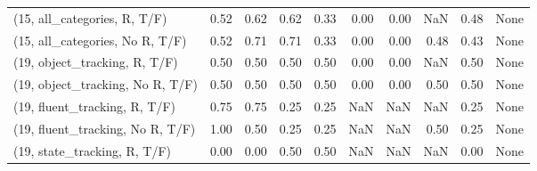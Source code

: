 \begin{table*}[h!]
\begin{adjustbox}{width=2\columnwidth,center}
\begin{tabular}{lrrr|rrr|rrr}
(15, all\_categories, R, T/F)          &                      0.52 &                  0.62 &                      0.62 &                          0.33 &                      0.00 &                          0.00 &                                    NaN &                               0.48 &                                  None \\
(15, all\_categories, No R, T/F)       &                      0.52 &                  0.71 &                      0.71 &                          0.33 &                      0.00 &                          0.00 &                                   0.48 &                               0.43 &                                  None \\



\midrule
(19, object\_tracking, R, T/F)         &                      0.50 &                  0.50 &                      0.50 &                          0.50 &                      0.00 &                          0.00 &                                    NaN &                               0.50 &                                  None \\
(19, object\_tracking, No R, T/F)      &                      0.50 &                  0.50 &                      0.50 &                          0.50 &                      0.00 &                          0.00 &                                   0.50 &                               0.50 &                                  None \\
(19, fluent\_tracking, R, T/F)         &                      0.75 &                  0.75 &                      0.25 &                          0.25 &                       NaN &                           NaN &                                    NaN &                               0.25 &                                  None \\
(19, fluent\_tracking, No R, T/F)      &                      1.00 &                  0.50 &                      0.25 &                          0.25 &                       NaN &                           NaN &                                   0.50 &                               0.25 &                                  None \\
(19, state\_tracking, R, T/F)          &                      0.00 &                  0.00 &                      0.50 &                          0.50 &                       NaN &                           NaN &                                    NaN &                               0.00 &                                  None \\

\end{tabular}
\end{adjustbox}
\end{table*}

